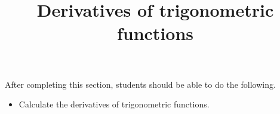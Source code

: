 \documentclass{ximera}
\title{Derivatives of trigonometric functions}
\begin{document}
\begin{abstract} 
\end{abstract}

\maketitle

\begin{sectionOutcomes}
After completing this section, students should be able to do the following.

\begin{itemize}
	\item Calculate the derivatives of trigonometric functions.
\end{itemize}
\end{sectionOutcomes}
\end{document}
